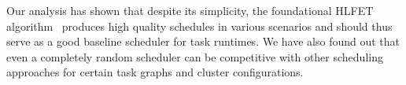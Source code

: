 Our analysis has shown that despite its simplicity, the foundational HLFET
algorithm~\cite{hlfet1974} produces high quality schedules in various scenarios and should
thus serve as a good baseline scheduler for task runtimes. We have also found out that even a
completely random scheduler can be competitive with other scheduling approaches for certain task
graphs and cluster configurations.


